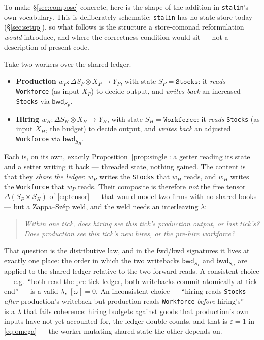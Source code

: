 \documentclass[11pt]{article}
\newcommand{\bwd}{\mathsf{bwd}}
\theoremstyle{plain}
\theoremstyle{definition}
\begin{document}
To make \S\ref{sec:compose} concrete, here is the shape of the addition in \texttt{stalin}'s own
vocabulary. This is deliberately schematic: \texttt{stalin} has no state store today (\S\ref{sec:setup}),
so what follows is the structure a store-comonad reformulation \emph{would} introduce, and where the
correctness condition would sit --- not a description of present code.

Take two workers over the shared ledger.
\begin{itemize}[leftmargin=1.4em,itemsep=2pt]
  \item \textbf{Production} $w_P:\Delta S_P\otimes X_P\to Y_P$, with state $S_P=\texttt{Stocks}$: it
        \emph{reads} \texttt{Workforce} (as input $X_P$) to decide output, and \emph{writes back}
        an increased \texttt{Stocks} via $\bwd_{S_P}$.
  \item \textbf{Hiring} $w_H:\Delta S_H\otimes X_H\to Y_H$, with state $S_H=\texttt{Workforce}$: it
        \emph{reads} \texttt{Stocks} (as input $X_H$, the budget) to decide output, and
        \emph{writes back} an adjusted \texttt{Workforce} via $\bwd_{S_H}$.
\end{itemize}
Each is, on its own, exactly Proposition~\ref{prop:single}: a getter reading its state and a setter
writing it back --- threaded state, nothing gained. The content is that they \emph{share the ledger}:
$w_P$ writes the \texttt{Stocks} that $w_H$ reads, and $w_H$ writes the \texttt{Workforce} that $w_P$
reads. Their composite is therefore \emph{not} the free tensor $\Delta(S_P\times S_H)$ of
\eqref{eq:tensor} --- that would model two firms with no shared books --- but a Zappa--Sz\'ep weld,
and the weld needs an interleaving $\lambda$:
\begin{quote}
\emph{Within one tick, does hiring see this tick's production output, or last tick's? Does production
see this tick's new hires, or the pre-hire workforce?}
\end{quote}
That question is the distributive law, and in the fwd/bwd signatures it lives at exactly one place:
the order in which the two writebacks $\bwd_{S_P}$ and $\bwd_{S_H}$ are applied to the shared ledger
relative to the two forward reads. A consistent choice --- e.g.\ ``both read the pre-tick ledger,
both writebacks commit atomically at tick end'' --- is a valid $\lambda$, $[\omega]=0$. An
inconsistent choice --- ``hiring reads \texttt{Stocks} \emph{after} production's writeback but
production reads \texttt{Workforce} \emph{before} hiring's'' --- is a $\lambda$ that fails coherence:
hiring budgets against goods that production's own inputs have not yet accounted for, the ledger
double-counts, and that is $\varepsilon=1$ in \eqref{eq:omega} --- the worker mutating shared state
the other depends on.
\end{document}
